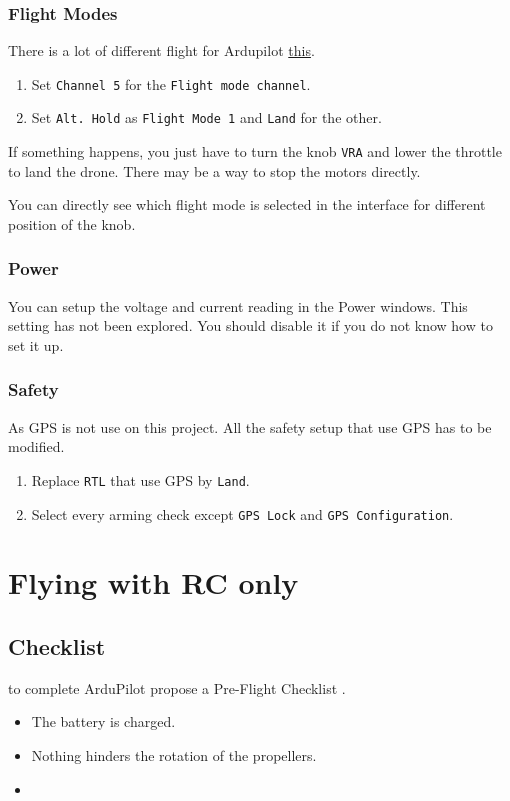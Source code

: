 \subsubsection{Flight Modes}
There is a lot of different flight for Ardupilot \href{http://ardupilot.org/copter/docs/flight-modes.html}{this}.
\begin{enumerate}
    \item Set \texttt{Channel 5} for the \texttt{Flight mode channel}.
    \item Set \texttt{Alt. Hold} as \texttt{Flight Mode 1} and \texttt{Land} for the other.
\end{enumerate}
If something happens, you just have to turn the knob \texttt{VRA} and lower the throttle to land the drone.
There may be a way to stop the motors directly.

You can directly see which flight mode is selected in the interface for different position of the knob.

\subsubsection{Power}
You can setup the voltage and current reading in the Power windows.
This setting has not been explored. You should disable it if you do not know how to set it up.

\subsubsection{Safety}
As GPS is not use on this project. All the safety setup that use GPS has to be modified.
\begin{enumerate}
    \item Replace \texttt{RTL} that use GPS by \texttt{Land}.
    \item Select every arming check except \texttt{GPS Lock} and \texttt{GPS Configuration}.
\end{enumerate}

\section{Flying with RC only}
\subsection{Checklist}
{\color{orange} to complete} ArduPilot propose a Pre-Flight Checklist \cite{ardupilot_checklist}.
\begin{itemize}
    \item The battery is charged.
    \item Nothing hinders the rotation of the propellers.
    \item
\end{itemize}

